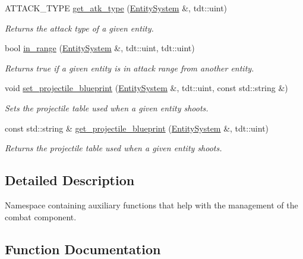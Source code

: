 \begin{DoxyCompactItemize}
A\+T\+T\+A\+C\+K\+\_\+\+T\+Y\+PE \hyperlink{namespace_combat_helper_a54246cf22299a62e9d5c44a59574cb8a}{get\+\_\+atk\+\_\+type} (\hyperlink{class_entity_system}{Entity\+System} \&, tdt\+::uint)
\begin{DoxyCompactList}\small\item\em Returns the attack type of a given entity. \end{DoxyCompactList}\item 
bool \hyperlink{namespace_combat_helper_ae85f16cae462e0bd50afb77d8e57b1a3}{in\+\_\+range} (\hyperlink{class_entity_system}{Entity\+System} \&, tdt\+::uint, tdt\+::uint)
\begin{DoxyCompactList}\small\item\em Returns true if a given entity is in attack range from another entity. \end{DoxyCompactList}\item 
void \hyperlink{namespace_combat_helper_a8202eec503e997d9379ba8fbea9e9d67}{set\+\_\+projectile\+\_\+blueprint} (\hyperlink{class_entity_system}{Entity\+System} \&, tdt\+::uint, const std\+::string \&)
\begin{DoxyCompactList}\small\item\em Sets the projectile table used when a given entity shoots. \end{DoxyCompactList}\item 
const std\+::string \& \hyperlink{namespace_combat_helper_aca3ae9dfa849314b5b8372fd4a1b4510}{get\+\_\+projectile\+\_\+blueprint} (\hyperlink{class_entity_system}{Entity\+System} \&, tdt\+::uint)
\begin{DoxyCompactList}\small\item\em Returns the projectile table used when a given entity shoots. \end{DoxyCompactList}\end{DoxyCompactItemize}


\subsection{Detailed Description}
Namespace containing auxiliary functions that help with the management of the combat component. 

\subsection{Function Documentation}
